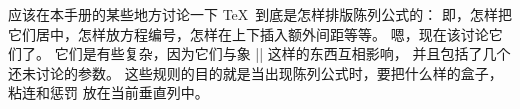 \ddanger \1应该在本手册的某些地方讨论一下 \TeX\ 到底是怎样排版陈列公式的：
即，怎样把它们居中，怎样放方程编号，怎样在上下插入额外间距等等。%
嗯，现在该讨论它们了。%
它们是有些复杂，因为它们与象 |\parshape| 这样的东西互相影响，
并且包括了几个还未讨论的参数。%
这些规则的目的就是当出现陈列公式时，要把什么样的盒子，粘连和惩罚%
放在当前垂直列中。

